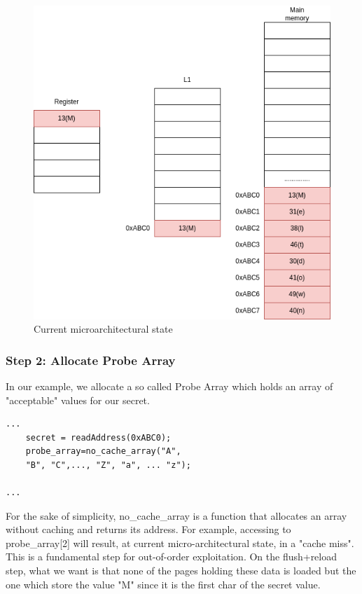 \begin{figure}[!h]
    \includegraphics[scale=0.25]{img/meltdown-step-one.png}
    \caption{Current microarchitectural state}
\end{figure}


\subsubsection{Step 2: Allocate Probe Array}
In our example, we allocate a so called Probe Array which holds an array of "acceptable" values for our secret.
\begin{Verbatim}[fontsize=\small]
...
    secret = readAddress(0xABC0);
    probe_array=no_cache_array("A",
	"B", "C",..., "Z", "a", ... "z");

...
\end{Verbatim}
For the sake of simplicity, no\_cache\_array is a function that allocates an array without caching and returns its address.
For example, accessing to probe\_array[2] will result, at current micro-architectural state, in a "cache miss".
This is a fundamental step for out-of-order exploitation.
On the flush+reload step, what we want is that none of the pages holding these data is loaded but the one which store the value
"M" since it is the first char of the secret value.

